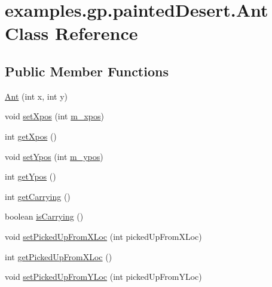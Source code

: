 \hypertarget{classexamples_1_1gp_1_1painted_desert_1_1_ant}{\section{examples.\-gp.\-painted\-Desert.\-Ant Class Reference}
\label{classexamples_1_1gp_1_1painted_desert_1_1_ant}
}
\subsection*{Public Member Functions}
\begin{DoxyCompactItemize}
\item 
\hyperlink{classexamples_1_1gp_1_1painted_desert_1_1_ant_af2f6b038cb4f226c6fd5292ab83f17e8}{Ant} (int x, int y)
\item 
void \hyperlink{classexamples_1_1gp_1_1painted_desert_1_1_ant_ae890ed78d77d7c3958d3d649192c7461}{set\-Xpos} (int \hyperlink{classexamples_1_1gp_1_1painted_desert_1_1_ant_a84346d8657288f8b63c1d45e1490445c}{m\-\_\-xpos})
\item 
int \hyperlink{classexamples_1_1gp_1_1painted_desert_1_1_ant_af7e97ed9804d1d26c422408360d2f63e}{get\-Xpos} ()
\item 
void \hyperlink{classexamples_1_1gp_1_1painted_desert_1_1_ant_aeeb823f6d8d523b82bac4fe91e0aa21b}{set\-Ypos} (int \hyperlink{classexamples_1_1gp_1_1painted_desert_1_1_ant_a2f61949bf3f5ddb83f6b753aeed37da8}{m\-\_\-ypos})
\item 
int \hyperlink{classexamples_1_1gp_1_1painted_desert_1_1_ant_a219d71f5bc1e305ead24b3a419a76d7e}{get\-Ypos} ()
\item 
int \hyperlink{classexamples_1_1gp_1_1painted_desert_1_1_ant_a8372766f39eb096879a3d98c2f3d546c}{get\-Carrying} ()
\item 
boolean \hyperlink{classexamples_1_1gp_1_1painted_desert_1_1_ant_a13ca6ab30edc07a1d37af0a8abbecb02}{is\-Carrying} ()
\item 
void \hyperlink{classexamples_1_1gp_1_1painted_desert_1_1_ant_a5a0d7204f9387b65a0e8bd5d38943f54}{set\-Picked\-Up\-From\-X\-Loc} (int picked\-Up\-From\-X\-Loc)
\item 
int \hyperlink{classexamples_1_1gp_1_1painted_desert_1_1_ant_a802e4a405c75d6373eb9cd5e944a1f45}{get\-Picked\-Up\-From\-X\-Loc} ()
\item 
void \hyperlink{classexamples_1_1gp_1_1painted_desert_1_1_ant_a869c8c56ecbd809631983df1f193eb4e}{set\-Picked\-Up\-From\-Y\-Loc} (int picked\-Up\-From\-Y\-Loc)

\end{DoxyCompactItemize}
